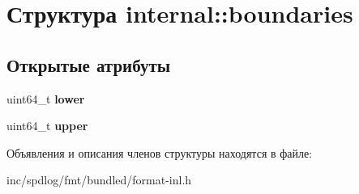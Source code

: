 \hypertarget{structinternal_1_1boundaries}{}\section{Структура internal\+:\+:boundaries}
\label{structinternal_1_1boundaries}
\subsection*{Открытые атрибуты}
\begin{DoxyCompactItemize}
\item 
\mbox{\label{structinternal_1_1boundaries_a492e530b36de3bc74735d4667b9ee844}} 
uint64\+\_\+t {\bfseries lower}
\item 
\mbox{\label{structinternal_1_1boundaries_a2e5df6114ad8c1f3f110b4ba8d8f8cdc}} 
uint64\+\_\+t {\bfseries upper}
\end{DoxyCompactItemize}


Объявления и описания членов структуры находятся в файле\+:\begin{DoxyCompactItemize}
\item 
inc/spdlog/fmt/bundled/format-\/inl.\+h\end{DoxyCompactItemize}

